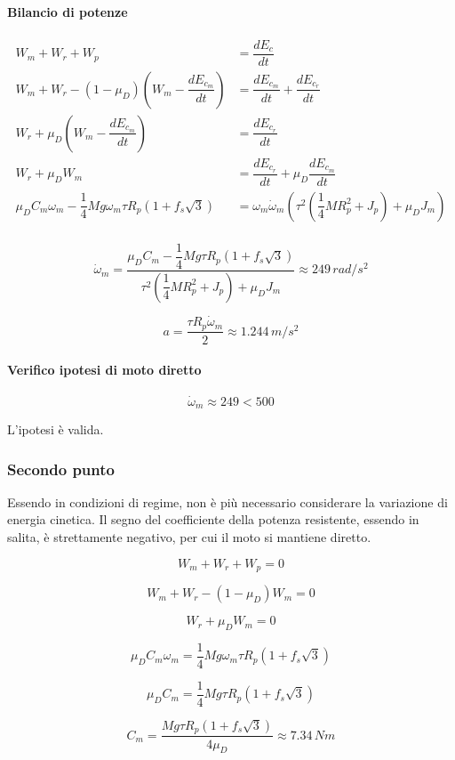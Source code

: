 \documentclass[main.tex]{subfiles}
\begin{document}
\paragraph{Bilancio di potenze}

\begin{align*}
	W_m + W_r + W_p &= \dfrac{dE_c}{dt}\\
	W_m + W_r - (1-\mu_D)(W_m - \dfrac{dE_{c_m}}{dt}) &= \dfrac{dE_{c_m}}{dt} + \dfrac{dE_{c_r}}{dt}\\
	W_r + \mu_D(W_m - \dfrac{dE_{c_m}}{dt}) &= \dfrac{dE_{c_r}}{dt}\\
	W_r + \mu_DW_m &= \dfrac{dE_{c_r}}{dt} + \mu_D\dfrac{dE_{c_m}}{dt}\\
	\mu_DC_m\omega_m -\dfrac{1}{4}Mg\omega_m \tau R_p(1+f_s\sqrt{3}) &=  \omega_m\dot{\omega}_m(\tau^2(\dfrac{1}{4}M R_p^2 + J_p) +  \mu_DJ_m)\\
\end{align*}

\[
\dot{\omega}_m = \dfrac{\mu_DC_m -\dfrac{1}{4}Mg\tau R_p(1+f_s\sqrt{3})}{\tau^2(\dfrac{1}{4}M R_p^2 + J_p) +  \mu_DJ_m} \approx 249\,rad/s^2
\]

\[
	a = \dfrac{\tau R_p \dot{\omega}_m}{2} \approx 1.244\,m/s^2
\]

\paragraph{Verifico ipotesi di moto diretto}

\[
	\dot{\omega}_m \approx 249 < 500
\]

L'ipotesi è valida.

\subsubsection{Secondo punto}
Essendo in condizioni di regime, non è più necessario considerare la variazione di energia cinetica. Il segno del coefficiente della potenza resistente, essendo in salita, è strettamente negativo, per cui il moto si mantiene diretto.

\[
	W_m + W_r + W_p = 0
\]

\[
	W_m + W_r - (1-\mu_D)W_m = 0
\]

\[
	W_r + \mu_DW_m = 0
\]

\[
	\mu_DC_m\omega_m = \dfrac{1}{4}Mg\omega_m \tau R_p(1+f_s\sqrt{3})
\]

\[
	\mu_DC_m = \dfrac{1}{4}Mg \tau R_p(1+f_s\sqrt{3})
\]

\[
	C_m = \dfrac{Mg \tau R_p(1+f_s\sqrt{3})}{4\mu_D} \approx 7.34\,Nm
\]
\end{document}

